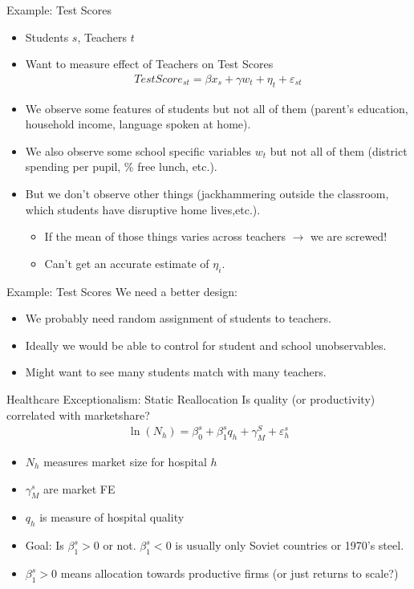 \documentclass[aspectratio=169]{beamer}
\begin{document}
\begin{frame}{Example: Test Scores}
\begin{itemize}
\item Students $s$, Teachers $t$
\item Want to measure effect of \alert{Teachers} on \alert{Test Scores}
\begin{eqnarray*}
TestScore_{st} = \beta x_s +\gamma w_t+  \eta_{t} + \varepsilon_{st}
\end{eqnarray*}
\item We observe some features of students but not all of them (parent's education, household income, language spoken at home).
\item We also observe some school specific variables $w_t$ but not all of them (district spending per pupil, \% free lunch, etc.).
\item But we don't observe other things (jackhammering outside the classroom, which students have disruptive home lives,etc.).
\begin{itemize}
\item If the mean of those things varies across teachers $\rightarrow$ we are screwed!
\item Can't get an accurate estimate of $\eta_i$.
\end{itemize}
\end{itemize}
\end{frame}


\begin{frame}{Example: Test Scores}
We need a better design:
\begin{itemize}
\item We probably need random assignment of students to teachers.
\item Ideally we would be able to control for student and school unobservables.
\item Might want to see many students match with many teachers.
\end{itemize}
\end{frame}

\begin{frame}{Healthcare Exceptionalism: Static Reallocation}
Is \alert{quality} (or productivity) correlated with \alert{marketshare}?
\begin{align*}
\ln \left(N_{h}\right)=\beta_{0}^{s}+\beta_{1}^{s} q_{h}+\gamma_{M}^{S}+\varepsilon_{h}^{s}
\end{align*}
\begin{itemize}
\item $N_h$ measures market size for hospital $h$
\item $\gamma_M^s$ are market FE
\item $q_h$ is measure of hospital quality
\item Goal: Is $\beta_1^s>0$ or not. $\beta_1^s<0$ is usually only Soviet countries or 1970's steel.
\item $\beta_1^s>0$ means allocation towards productive firms (or just returns to scale?)
\end{itemize}
\end{frame}
\end{document}
